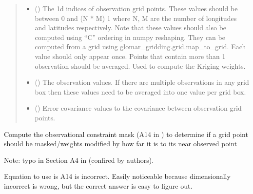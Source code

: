 \documentclass[letterpaper,10pt,english]{sphinxmanual}
\begin{document}
\begin{fulllineitems}
\begin{quote}
\begin{description}
\begin{itemize}
\item {}
\sphinxAtStartPar
{} () \textendash{} The 1d indices of observation grid points. These values should be
between 0 and (N * M) \sphinxhyphen{} 1 where N, M are the number of longitudes
and latitudes respectively. Note that these values should also be
computed using “C” ordering in numpy reshaping. They can be
computed from a grid using glomar\_gridding.grid.map\_to\_grid. Each
value should only appear once. Points that contain more than 1
observation should be averaged. Used to compute the Kriging weights.

\item {}
\sphinxAtStartPar
{} () \textendash{} The observation values. If there are multiple observations in any
grid box then these values need to be averaged into one value per
grid box.

\item {}
\sphinxAtStartPar
{} () \textendash{} Error covariance values to the covariance between observation grid
points.

\end{itemize}

\end{description}\end{quote}

\begin{fulllineitems}
\label{\detokenize{kriging:glomar_gridding.stochastic.StochasticKriging.constraint_mask}}
\pysigstartsignatures
\pysiglinewithargsret
{}
{}
{}
\pysigstopsignatures
\sphinxAtStartPar
Compute the observational constraint mask (A14 in ) to
determine if a grid point should be masked/weights modified by how far
it is to its near observed point

\sphinxAtStartPar
Note: typo in Section A4 in  (confired by authors).

\sphinxAtStartPar
Equation to use is A14 is incorrect. Easily noticeable because
dimensionally incorrect is wrong, but the correct answer is easy to
figure out.


\end{fulllineitems}
\end{fulllineitems}
\end{document}
